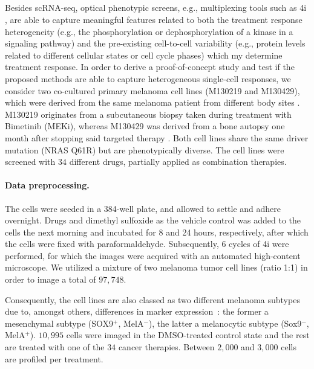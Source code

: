 \subsection{\citet{bunne2021learning}}
\label{app:dataset_bunne}

Besides sc\acrshort{RNA-seq}, optical phenotypic screens, e.g., multiplexing tools such as 4i \citep{gut2018multiplexed}, are able to capture meaningful features related to both the treatment response heterogeneity (e.g., the phosphorylation or dephosphorylation of a kinase in a signaling pathway) and the pre-existing cell-to-cell variability (e.g., protein levels related to different cellular states or cell cycle phases) which my determine treatment response. 
In order to derive a proof-of-concept study and test if the proposed methods are able to capture heterogeneous single-cell responses, we consider two co-cultured primary melanoma cell lines (M130219 and M130429), which were derived from the same melanoma patient from different body sites \citet{bunne2021learning}.
M130219 originates from a subcutaneous biopsy taken during treatment with Bimetinib (MEKi), whereas M130429 was derived from a bone autopsy one month after stopping said targeted therapy \citep{raaijmakers2015new}. Both cell lines share the same driver mutation (NRAS Q61R) but are phenotypically diverse. The cell lines were screened with $34$ different drugs, partially applied as combination therapies.

\paragraph{Data preprocessing.}
The cells were seeded in a 384-well plate, and allowed to settle and adhere overnight. Drugs and dimethyl sulfoxide as the vehicle control was added to the cells the next morning and incubated for 8 and 24 hours, respectively, after which the cells were fixed with paraformaldehyde. Subsequently, 6 cycles of 4i were performed, for which the images were acquired with an automated high-content microscope.
We utilized a mixture of two melanoma tumor cell lines (ratio 1:1) in order to image a total of $97,748$.

Consequently, the cell lines are also classed as two different melanoma subtypes due to, amongst others, differences in marker expression~\citep{raaijmakers2015new}: the former a mesenchymal subtype (SOX9$^+$, MelA$^-$), the latter a melanocytic subtype (Sox9$^-$, MelA$^+$).
$10,995$ cells were imaged in the DMSO-treated control state and the rest are treated with one of the $34$ cancer therapies. Between $2,000$ and $3,000$ cells are profiled per treatment.

